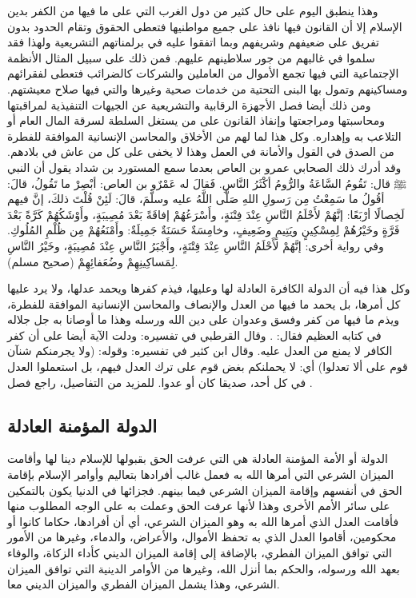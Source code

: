 وهذا ينطبق اليوم على حال كثير من دول الغرب التي على ما فيها من الكفر بدين الإسلام إلا أن القانون فيها نافذ على جميع مواطنيها فتعطى الحقوق وتقام الحدود بدون تفريق على ضعيفهم وشريفهم وبما اتفقوا عليه في برلمناتهم التشريعية ولهذا فقد سلموا في غالبهم من جور سلاطينهم عليهم. فمن ذلك على سبيل المثال الأنظمة الإجتماعية التي فيها تجمع الأموال من العاملين والشركات كالضرائب فتعطى لفقرائهم ومساكينهم وتمول بها البنى التحتية من خدمات صحية وغيرها والتي فيها صلاح معيشتهم. ومن ذلك أيضا فصل الأجهزة الرقابية والتشريعية عن الجيهات التنفيذية لمراقبتها ومحاسبتها ومراجعتها وإنفاذ القانون على من يستغل السلطة لسرقة المال العام أو التلاعب به وإهداره. وكل هذا لما لهم من الأخلاق والمحاسن الإنسانية الموافقة للفطرة من الصدق في القول والأمانة في العمل وهذا لا يخفى على كل من عاش في بلادهم. وقد أدرك ذلك الصحابي عمرو بن العاص بعدما سمع المستورد بن شداد يقول أن النبي ﷺ قال: تَقُومُ السَّاعَةُ والرُّومُ أكْثَرُ النَّاسِ. فَقالَ له عَمْرٌو بن العاص: أبْصِرْ ما تَقُولُ، قالَ: أقُولُ ما سَمِعْتُ مِن رَسولِ اللهِ صَلَّى اللَّهُ عليه وسلَّمَ، قالَ: لَئِنْ قُلْتَ ذلكَ، إنَّ فيهم لَخِصالًا أرْبَعًا: إنَّهُمْ لأَحْلَمُ النَّاسِ عِنْدَ فِتْنَةٍ، وأَسْرَعُهُمْ إفاقَةً بَعْدَ مُصِيبَةٍ، وأَوْشَكُهُمْ كَرَّةً بَعْدَ فَرَّةٍ وخَيْرُهُمْ لِمِسْكِينٍ ويَتِيمٍ وضَعِيفٍ، وخامِسَةٌ حَسَنَةٌ جَمِيلَةٌ: وأَمْنَعُهُمْ مِن ظُلْمِ المُلُوكِ. وفي رواية أخرى: إنَّهُمْ لأَحْلَمُ النَّاسِ عِنْدَ فِتْنَةٍ، وأَجْبَرُ النَّاسِ عِنْدَ مُصِيبَةٍ، وخَيْرُ النَّاسِ لِمَساكِينِهِمْ وضُعَفائِهِمْ {\footnotesize (صحيح مسلم)}. 

وكل هذا فيه أن الدولة الكافرة العادلة لها وعليها، فيذم كفرها ويحمد عدلها، ولا يرد عليها كل أمرها، بل يحمد ما فيها من العدل والإنصاف والمحاسن الإنسانية الموافقة للفطرة، ويذم ما فيها من كفر وفسق وعدوان على دين الله ورسله وهذا ما أوصانا به جل جلاله في كتابه العظيم فقال: 
\quranayah*[5][8]{\footnotesize \surahname*[5]}. وقال القرطبي في تفسيره: ودلت الآية أيضا على أن كفر الكافر لا يمنع من العدل عليه. وقال ابن كثير في تفسيره: وقوله: (ولا يجرمنكم شنآن قوم على ألا تعدلوا) أي: لا يحملنكم بغض قوم على ترك العدل فيهم، بل استعملوا العدل في كل أحد، صديقا كان أو عدوا. للمزيد من التفاصيل، راجع فصل .

\subsection{الدولة المؤمنة العادلة}

الدولة أو الأمة المؤمنة العادلة هي التي عرفت الحق بقبولها للإسلام دينا لها وأقامت الميزان الشرعي التي أمرها الله به فعمل غالب أفرادها بتعاليم وأوامر الإسلام بإقامة الحق في أنفسهم وإقامة الميزان الشرعي فيما بينهم. فجزائها في الدنيا يكون بالتمكين على سائر الأمم الأخرى وهذا لأنها عرفت الحق وعملت به على الوجه المطلوب منها فأقامت العدل الذي أمرها الله به وهو الميزان الشرعي، أي أن أفرادها، حكاما كانوا أو محكومين، أقاموا العدل الذي به تحفظ الأموال، والأعراض، والدماء، وغيرها من الأمور التي توافق الميزان الفطري، بالإضافة إلى إقامة الميزان الديني كأداء الزكاة، والوفاء بعهد الله ورسوله، والحكم بما أنزل الله، وغيرها من الأوامر الدينية التي توافق الميزان الشرعي، وهذا يشمل الميزان الفطري والميزان الديني معا.

